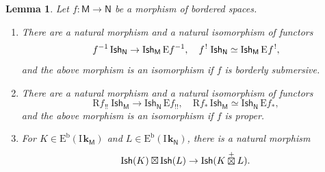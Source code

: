 \documentclass[JEP,XML,SOM,Unicode]{cedram}
\newenvironment{enumeratei}
{\bgroup\def\theenumi{\roman{enumi}}\def\theenumii{\alph{enumii}}\begin{enumerate}}
{\end{enumerate}\egroup}
\theoremstyle{plain}
\newtheorem{lemma}[theorem]{Lemma}
\theoremstyle{definition}
\newcommand{\derived}[1]{\mathrm{#1}}
\newcommand{\dere}{\derived{E}}\let\enh\dere
\newcommand{\derr}{\derived{R}}
\newcommand{\BEC}[2][\ifield]{\dere^{\mathrm{b}}(#1_{#2})}
\newcommand{\roim}[1]{\derr#1_*}
\newcommand{\reeim}[1]{\derr#1_{\mspace{1mu}!!}\mspace{1mu}}
\newcommand{\epb}[1]{#1^{\mspace{1.5mu}!}\mspace{2mu}}
\newcommand{\etens}[1][]{\mathbin{\boxtimes_{\raise1.5ex\hbox to-.1em{}#1}}}
\newcommand{\Eopb}[1]{\enh#1^{-1}}
\newcommand{\Eoim}[1]{\enh#1_*}
\newcommand{\Eeeim}[1]{\enh#1_{!!}}
\newcommand{\Eepb}[1]{\enh\mspace{1mu}#1^{\mspace{1.5mu}!}}
\newcommand{\field}{\mathbf{k}}\let\cor\field
\newcommand{\ind}{\mathrm{I}\mspace{2mu}}
\newcommand{\ifield}{\ind\field}
\newcommand{\cetens}{\mathbin{\mathop\boxtimes\limits^+}}
\newcommand{\Ish}{\mathrm{I}\mathsf{sh}}
\newcommand{\bbM}{\mathsf{M}}
\newcommand{\bbN}{\mathsf{N}}
\newcommand{\opb}[1]{#1^{-1}}
\begin{document}
\begin{lemma}\label{lem:ishop}
Let $f\colon \bbM\to \bbN$ be a morphism of bordered spaces.
\begin{enumeratei}
\item\label{lem:ishopi}
There are a natural morphism and a natural isomorphism of functors
\[
\opb f \, \Ish_{\bbN} \to \Ish_{\bbM} \, \Eopb f, \quad
\epb f \, \Ish_{\bbN} \simeq \Ish_{\bbM} \, \Eepb f,
\]
and the above morphism is an isomorphism if $f$ is borderly submersive.
\item\label{lem:ishopii}
There are a natural morphism and a natural isomorphism of functors
\[
\reeim f \, \Ish_{\bbM} \to \Ish_{\bbN} \, \Eeeim f, \quad
\roim f \, \Ish_{\bbM} \simeq \Ish_{\bbN} \, \Eoim f,
\]
and the above morphism is an isomorphism if $f$ is proper.
\item\label{lem:ishopiii}
For $K\in\BEC\bbM$ and $L\in\BEC\bbN$,
there is a natural morphism
\[
\Ish(K)\etens\Ish(L)\to\Ish(K\cetens L).
\]
\end{enumeratei}
\end{lemma}
\end{document}
